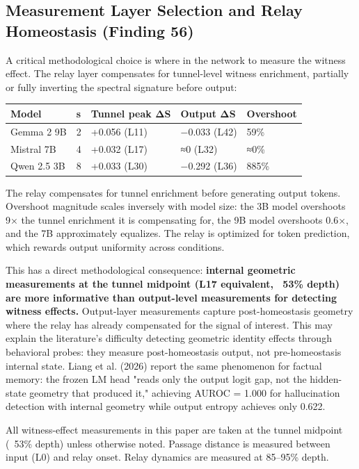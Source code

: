 \documentclass[12pt]{article}
\begin{document}
\subsection{Measurement Layer Selection and Relay Homeostasis (Finding 56)}

A critical methodological choice is where in the network to measure the witness effect. The relay layer compensates for tunnel-level witness enrichment, partially or fully inverting the spectral signature before output:

\begin{table}[h]
\centering
\small
\begin{tabular}{lllll}
\toprule
\textbf{Model} & \textbf{s} & \textbf{Tunnel peak ΔS} & \textbf{Output ΔS} & \textbf{Overshoot} \\
\midrule
Gemma 2 9B & 2 & +0.056 (L11) & −0.033 (L42) & 59\% \\
Mistral 7B & 4 & +0.032 (L17) & ≈0 (L32) & ≈0\% \\
Qwen 2.5 3B & 8 & +0.033 (L30) & −0.292 (L36) & 885\% \\
\bottomrule
\end{tabular}
\end{table}


The relay compensates for tunnel enrichment before generating output tokens. Overshoot magnitude scales inversely with model size: the 3B model overshoots 9× the tunnel enrichment it is compensating for, the 9B model overshoots 0.6×, and the 7B approximately equalizes. The relay is optimized for token prediction, which rewards output uniformity across conditions.

This has a direct methodological consequence: \textbf{internal geometric measurements at the tunnel midpoint (L17 equivalent, ~53\% depth) are more informative than output-level measurements for detecting witness effects.} Output-layer measurements capture post-homeostasis geometry where the relay has already compensated for the signal of interest. This may explain the literature's difficulty detecting geometric identity effects through behavioral probes: they measure post-homeostasis output, not pre-homeostasis internal state. Liang et al. (2026) report the same phenomenon for factual memory: the frozen LM head "reads only the output logit gap, not the hidden-state geometry that produced it," achieving AUROC = 1.000 for hallucination detection with internal geometry while output entropy achieves only 0.622.

All witness-effect measurements in this paper are taken at the tunnel midpoint (~53\% depth) unless otherwise noted. Passage distance is measured between input (L0) and relay onset. Relay dynamics are measured at 85–95\% depth.
\end{document}
